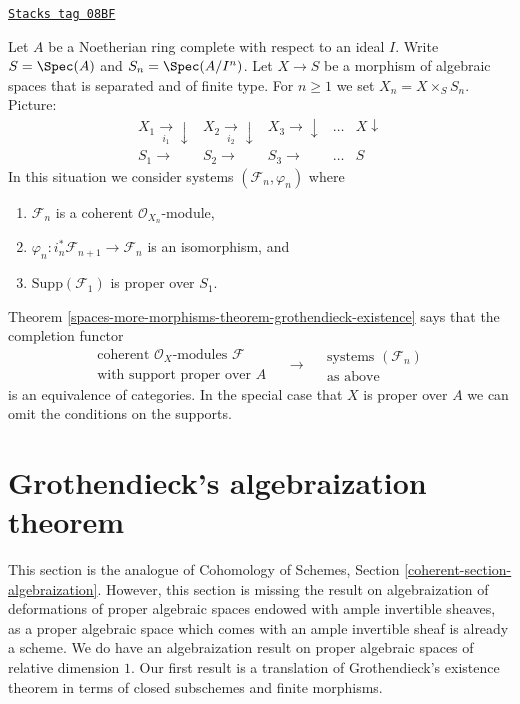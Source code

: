 \begin{remark}

\label{spaces-more-morphisms-remark-reformulate-existence-theorem}
\href{https://stacks.math.columbia.edu/tag/08BF}{\texttt{Stacks tag 08BF}}

Let $A$ be a Noetherian ring complete with respect to an ideal $I$.
Write $S = \Spec(A)$ and $S_n = \Spec(A/I^n)$.
Let $X \to S$ be a morphism of algebraic spaces that is separated and
of finite type. For $n \geq 1$ we set $X_n = X \times_S S_n$.
Picture:
$$
\begin{array}{ccccc}X_1 \underset{i_1}{\longrightarrow}\downarrow & X_2 \underset{i_2}{\longrightarrow}\downarrow & X_3 \longrightarrow\downarrow & \ldots & X \downarrow \\ S_1 \longrightarrow & S_2 \longrightarrow & S_3 \longrightarrow & \ldots & S\end{array}
$$
In this situation we consider systems $(\mathcal{F}_n, \varphi_n)$
where
\begin{enumerate}
\item $\mathcal{F}_n$ is a coherent $\mathcal{O}_{X_n}$-module,
\item $\varphi_n : i_n^*\mathcal{F}_{n + 1} \to \mathcal{F}_n$
is an isomorphism, and
\item $\text{Supp}(\mathcal{F}_1)$ is proper over $S_1$.
\end{enumerate}
Theorem \ref{spaces-more-morphisms-theorem-grothendieck-existence} says that the
completion functor
$$
\begin{matrix}
\text{coherent }\mathcal{O}_X\text{-modules }\mathcal{F} \\
\text{with support proper over }A
\end{matrix}
\quad
\longrightarrow
\quad
\begin{matrix}
\text{systems }(\mathcal{F}_n) \\
\text{as above}
\end{matrix}
$$
is an equivalence of categories. In the special case that $X$ is
proper over $A$ we can omit the conditions on the supports.
\end{remark}

\section{Grothendieck's algebraization theorem}
\label{spaces-more-morphisms-section-algebraization}
This section is the analogue of
Cohomology of Schemes, Section \ref{coherent-section-algebraization}.
However, this section is missing the result on algebraization of deformations
of proper algebraic spaces endowed with ample invertible sheaves, as a
proper algebraic space which comes with an ample invertible sheaf is
already a scheme. We do have an algebraization result on proper
algebraic spaces of relative dimension $1$.
Our first result is a translation of Grothendieck's existence
theorem in terms of closed subschemes and finite morphisms.

